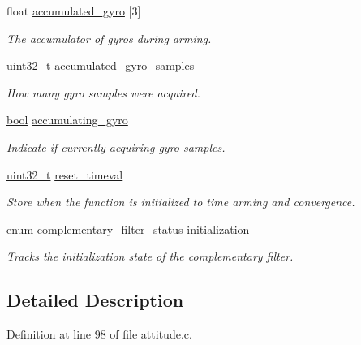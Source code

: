 \begin{DoxyCompactItemize}
float \hyperlink{structcomplementary__filter__state_ada568dc8edca423fd6744e58049272e9}{accumulated\-\_\-gyro} \mbox{[}3\mbox{]}
\begin{DoxyCompactList}\small\item\em The accumulator of gyros during arming. \end{DoxyCompactList}\item 
\hyperlink{stdint_8h_a435d1572bf3f880d55459d9805097f62}{uint32\-\_\-t} \hyperlink{structcomplementary__filter__state_ae32da25bd01d785b59379dea487222dc}{accumulated\-\_\-gyro\-\_\-samples}
\begin{DoxyCompactList}\small\item\em How many gyro samples were acquired. \end{DoxyCompactList}\item 
\hyperlink{group___exported__types_gaf6a258d8f3ee5206d682d799316314b1}{bool} \hyperlink{structcomplementary__filter__state_a0a5740a2b1f2c69d56ee1c5d4ace3d20}{accumulating\-\_\-gyro}
\begin{DoxyCompactList}\small\item\em Indicate if currently acquiring gyro samples. \end{DoxyCompactList}\item 
\hyperlink{stdint_8h_a435d1572bf3f880d55459d9805097f62}{uint32\-\_\-t} \hyperlink{structcomplementary__filter__state_a5b8422bb68fa412d1ff92c82331c18ec}{reset\-\_\-timeval}
\begin{DoxyCompactList}\small\item\em Store when the function is initialized to time arming and convergence. \end{DoxyCompactList}\item 
enum \hyperlink{group___attitude_ga2a3dfab57b52ff023f9197d9afe06ff4}{complementary\-\_\-filter\-\_\-status} \hyperlink{structcomplementary__filter__state_a28dd748e22efb34aa6dddf4873b1c445}{initialization}
\begin{DoxyCompactList}\small\item\em Tracks the initialization state of the complementary filter. \end{DoxyCompactList}\end{DoxyCompactItemize}


\subsection{Detailed Description}


Definition at line 98 of file attitude.\-c.




